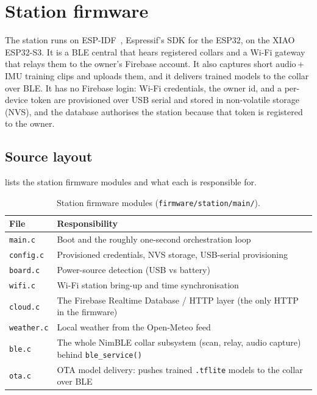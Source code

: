 \section{Station firmware}
\label{sec:firmware-station}

The station runs on ESP-IDF~\cite{espidf}, Espressif's SDK for the ESP32, on the XIAO ESP32-S3. It is a BLE central that hears
registered collars and a Wi-Fi gateway that relays them to the owner's Firebase account. It also
captures short audio\,+\,IMU training clips and uploads them, and it delivers trained models to the
collar over BLE. It has no Firebase login: Wi-Fi credentials, the owner id, and a per-device token are
provisioned over USB serial and stored in non-volatile storage (NVS), and the database authorises the
station because that token is registered to the owner.

\subsection{Source layout}

 lists the station firmware modules and what each is responsible for.

\begin{table}[ht]
  \centering
  \caption{Station firmware modules (\texttt{firmware/station/main/}).}
  \label{tab:station-src}
  \begin{tabularx}{\textwidth}{@{}lX@{}}
    \toprule
    \textbf{File} & \textbf{Responsibility} \\
    \midrule
    \texttt{main.c}    & Boot and the roughly one-second orchestration loop \\
    \texttt{config.c}  & Provisioned credentials, NVS storage, USB-serial provisioning \\
    \texttt{board.c}   & Power-source detection (USB vs battery) \\
    \texttt{wifi.c}    & Wi-Fi station bring-up and time synchronisation \\
    \texttt{cloud.c}   & The Firebase Realtime Database / HTTP layer (the only HTTP in the firmware) \\
    \texttt{weather.c} & Local weather from the Open-Meteo feed \\
    \texttt{ble.c}     & The whole NimBLE collar subsystem (scan, relay, audio capture) behind \texttt{ble\_service()} \\
    \texttt{ota.c}     & OTA model delivery: pushes trained \texttt{.tflite} models to the collar over BLE \\
    \bottomrule
  \end{tabularx}
\end{table}

